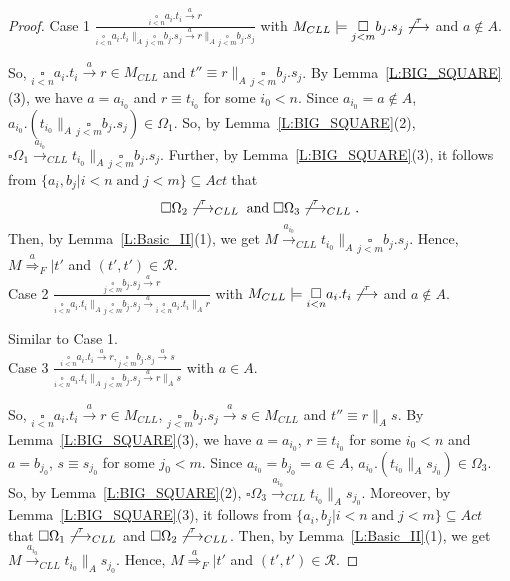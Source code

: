 \documentclass{elsarticle}
\theoremstyle{plain}
\theoremstyle{definition}
\begin{document}
\begin{proof}
\noindent  Case 1 $\frac{\underset{i< n}{\square}a_i.t_i \stackrel{a}{\longrightarrow} r}{\underset{i< n}{\square}a_i.t_i \parallel_A \underset{j< m}{\square}b_j.s_j \stackrel{a}{\longrightarrow}r\parallel_A \underset{j< m}{\square}b_j.s_j}$ with $M_{CLL}\models \underset{j< m}{\square}b_j.s_j \not\stackrel{\tau}{\longrightarrow}$ and $a\notin A$.

  So, $\underset{i< n}{\square}a_i.t_i \stackrel{a}{\longrightarrow} r \in M_{CLL}$ and $t'' \equiv r\parallel_A \underset{j< m}{\square}b_j.s_j$.
  By Lemma~\ref{L:BIG_SQUARE}(3), we have $a= a_{i_0}$ and $r \equiv t_{i_0}$ for some $i_0 < n$.
  Since $a_{i_0}=a \notin A$, $a_{i_0}.(t_{i_0} \parallel_A \underset{j< m}{\square}b_j.s_j) \in \Omega_1$.
  So, by Lemma~\ref{L:BIG_SQUARE}(2), $\square \Omega_1 \stackrel{a_{i_0}}{\longrightarrow}_{CLL}t_{i_0} \parallel_A \underset{j< m}{\square}b_j.s_j$.
  Further, by Lemma~\ref{L:BIG_SQUARE}(3), it follows from $\{a_i,b_j|i<n\;\text{and}\;j<m\}\subseteq Act$ that
  \[\square \Omega_2 \not\stackrel{\tau}{\longrightarrow}_{CLL}\;\text{and}\;\square \Omega_3 \not\stackrel{\tau}{\longrightarrow}_{CLL}.\]
  Then, by Lemma~\ref{L:Basic_II}(1), we get  $M \stackrel{a_{i_0}}{\longrightarrow}_{CLL}t_{i_0} \parallel_A \underset{j< m}{\square}b_j.s_j$.
  Hence, $ M \stackrel{a}{\Longrightarrow}_F|t'$ and $(t',t')\in {\mathcal R}$.\\

\noindent  Case 2 $\frac{\underset{j< m}{\square}b_j.s_j \stackrel{a}{\longrightarrow} r}{\underset{i< n}{\square}a_i.t_i \parallel_A \underset{j< m}{\square}b_j.s_j \stackrel{a}{\longrightarrow} \underset{i< n}{\square}a_i.t_i \parallel_A r}$ with $M_{CLL}\models \underset{i< n}{\square}a_i.t_i \not\stackrel{\tau}{\longrightarrow}$ and $a\notin A$.

  Similar to Case 1.\\


\noindent  Case 3 $\frac{\underset{i< n}{\square}a_i.t_i \stackrel{a}{\longrightarrow} r,\underset{j< m}{\square}b_j.s_j \stackrel{a}{\longrightarrow} s}{\underset{i< n}{\square}a_i.t_i \parallel_A \underset{j< m}{\square}b_j.s_j \stackrel{a}{\longrightarrow}r\parallel_A s}$ with $a\in A$.

  So, $\underset{i< n}{\square}a_i.t_i \stackrel{a}{\longrightarrow} r \in M_{CLL}$, $ \underset{j< m}{\square}b_j.s_j \stackrel{a}{\longrightarrow} s \in M_{CLL}$ and $t'' \equiv r\parallel_A s$.
  By Lemma~\ref{L:BIG_SQUARE}(3), we have $a= a_{i_0}$, $r \equiv t_{i_0}$ for some $i_0 < n$ and $a = b_{j_0}$, $s \equiv s_{j_0}$ for some $j_0 < m$.
  Since $a_{i_0} = b_{j_0}=a \in A$, $a_{i_0}.(t_{i_0} \parallel_A s_{j_0}) \in \Omega_3$.
  So, by Lemma~\ref{L:BIG_SQUARE}(2), $\square \Omega_3 \stackrel{a_{i_0}}{\longrightarrow}_{CLL}t_{i_0} \parallel_A s_{j_0}$.
  Moreover, by Lemma~\ref{L:BIG_SQUARE}(3), it follows from $\{a_i,b_j|i<n\;\text{and}\;j<m\}\subseteq Act$ that $\square \Omega_1 \not\stackrel{\tau}{\longrightarrow}_{CLL}$ and $\square \Omega_2 \not\stackrel{\tau}{\longrightarrow}_{CLL}$. Then, by Lemma~\ref{L:Basic_II}(1), we get  $M \stackrel{a_{i_0}}{\longrightarrow}_{CLL}t_{i_0} \parallel_A s_{j_0}$.
  Hence, $ M \stackrel{a}{\Longrightarrow}_F|t'$ and $(t',t')\in {\mathcal R}$.


\end{proof}
\end{document}
